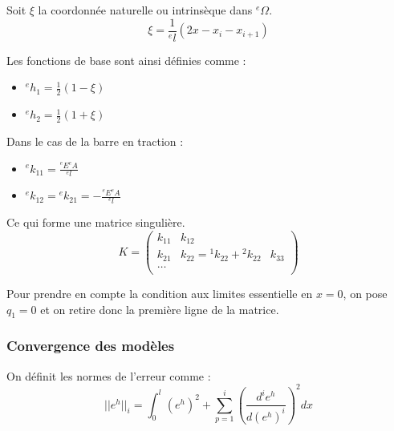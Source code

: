 \documentclass[../main.tex]{subfiles}
\begin{document}
Soit $\xi$ la coordonnée naturelle ou intrinsèque dans $^e\Omega$.\begin{equation}
    \xi = \frac{1}{{}^el}(2x-x_i-x_{i+1})
\end{equation}

Les fonctions de base sont ainsi définies comme : \begin{itemize}
    \item ${}^eh_1 = \frac{1}{2}(1-\xi)$\\
    \item ${}^eh_2 = \frac{1}{2}(1+\xi)$\\
\end{itemize}

Dans le cas de la barre en traction : \begin{itemize}
    \item ${}^ek_{11} = \frac{{}^eE {}^eA}{{}^el}$\\
    \item ${}^ek_{12} = {}^ek_{21} = -\frac{{}^eE {}^eA}{{}^el}$\\
\end{itemize}
Ce qui forme une matrice singulière. \\
\begin{equation}
    K = \begin{pmatrix}
        k_{11} & k_{12} &\\
        k_{21} & k_{22} = {}^1k_{22} + {}^2k_{22} & k_{33}\\
        \dots\\
    \end{pmatrix}
\end{equation}

Pour prendre en compte la condition aux limites essentielle en $x=0$, on pose $q_1=0$ et on retire donc la première ligne de la matrice.\\

\subsubsection{Convergence des modèles}
On définit les normes de l'erreur comme : \begin{equation}
    \lvert \lvert e^h\rvert\rvert_i = \int_0^l (e^h)^2+\sum_{p=1}^i (\frac{d^i e^h}{d (e^h)^i})^2 dx
\end{equation}
\end{document}
